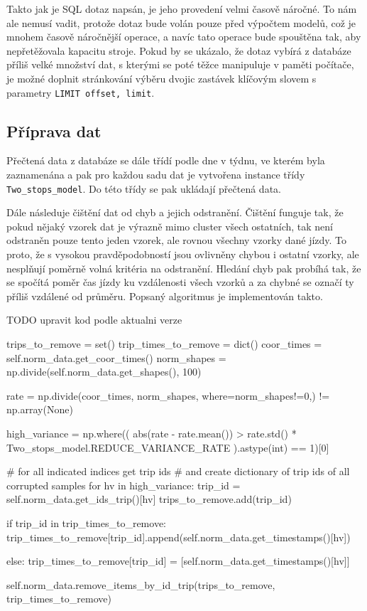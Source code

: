 \bigbreak


Takto jak je SQL dotaz napsán, je jeho provedení velmi časově náročné. To nám ale nemusí vadit, protože dotaz bude volán pouze před výpočtem modelů, což je mnohem časově náročnější operace, a navíc tato operace bude spouštěna tak, aby nepřetěžovala kapacitu stroje. Pokud by se ukázalo, že dotaz vybírá z databáze příliš velké množství dat, s kterými se poté těžce manipuluje v paměti počítače, je možné doplnit stránkování výběru dvojic zastávek klíčovým slovem s parametry \verb-LIMIT offset, limit-.


\subsection{Příprava dat}


Přečtená data z databáze se dále třídí podle dne v týdnu, ve kterém byla zaznamenána a pak pro každou sadu dat je vytvořena instance třídy \verb-Two_stops_model-. Do této třídy se pak ukládají přečtená data.


\bigbreak


Dále následuje čištění dat od chyb a jejich odstranění. Čištění funguje tak, že pokud nějaký vzorek dat je výrazně mimo cluster všech ostatních, tak není odstraněn pouze tento jeden vzorek, ale rovnou všechny vzorky dané jízdy. To proto, že s vysokou pravděpodobností jsou ovlivněny chybou i ostatní vzorky, ale nesplňují poměrně volná kritéria na odstranění. Hledání chyb pak probíhá tak, že se spočítá poměr čas jízdy ku vzdálenosti všech vzorků a za chybné se označí ty příliš vzdálené od průměru. Popsaný algoritmus je implementován takto.




TODO upravit kod podle aktualni verze
\begin{code}[frame=none]
trips_to_remove = set()
trip_times_to_remove = dict()
coor_times = self.norm_data.get_coor_times()
norm_shapes = np.divide(self.norm_data.get_shapes(), 100)


rate = np.divide(coor_times, norm_shapes, where=norm_shapes!=0,) != np.array(None)


high_variance = np.where((
    abs(rate - rate.mean()) > rate.std() * Two_stops_model.REDUCE_VARIANCE_RATE
  ).astype(int) == 1)[0]


# for all indicated indices get trip ids
# and create dictionary of trip ids of all corrupted samples
for hv in high_variance:
  trip_id = self.norm_data.get_ids_trip()[hv]
  trips_to_remove.add(trip_id)


  if trip_id in trip_times_to_remove:
    trip_times_to_remove[trip_id].append(self.norm_data.get_timestamps()[hv])


  else:
    trip_times_to_remove[trip_id] = [self.norm_data.get_timestamps()[hv]]


self.norm_data.remove_items_by_id_trip(trips_to_remove, trip_times_to_remove)
\end{code}


